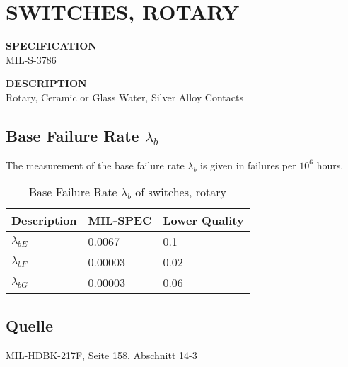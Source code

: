 \section{SWITCHES, ROTARY}

\begin{minipage}[t]{0.29\textwidth}
    \textbf{SPECIFICATION}\\
    MIL-S-3786
\end{minipage}
\begin{minipage}[t]{0.7\textwidth}
    \textbf{DESCRIPTION}\\
    Rotary, Ceramic or Glass Water, Silver Alloy Contacts
\end{minipage}

\subsection{Base Failure Rate $\lambda_b$}
The measurement of the base failure rate $\lambda_b$ is given in failures per $10^6$ hours.
\begin{table}[ht]
{\centering

\begin{tabular}{|p{3cm}|p{3cm}|p{3cm}|}
    \hline
    \textbf{Description} & \textbf{MIL-SPEC} & \textbf{Lower Quality} \\
    \hline
    $\lambda_{bE}$ & 0.0067 & 0.1 \\
    \hline
    $\lambda_{bF}$ & 0.00003 & 0.02 \\
    \hline
    $\lambda_{bG}$ & 0.00003 & 0.06 \\
    \hline
\end{tabular}

\caption{Base Failure Rate $\lambda_b$ of switches, rotary}

\label{tab:bfr_switches_rotary}
\par}
\end{table}
\subsection*{Quelle}
MIL-HDBK-217F, Seite 158, Abschnitt 14-3